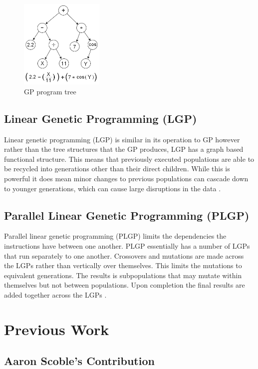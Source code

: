 \begin{figure}[h]
\centering
\includegraphics[width=40mm]{Genetic_Program_Tree.png}
\caption{GP program tree}
\centering
\end{figure}



\subsection{Linear Genetic Programming (LGP)}
Linear genetic programming (LGP) is similar in its operation to GP however rather than the tree structures that the GP produces, LGP has a graph based functional structure. This means that previously executed populations are able to be recycled into generations other than their direct children. While this is powerful it does mean minor changes to previous populations can cascade down to younger generations, which can cause large disruptions in the data \cite{poli1} \cite{16} \cite{17}. 


\subsection{Parallel Linear Genetic Programming (PLGP)}
Parallel linear genetic programming (PLGP) limits the dependencies the instructions have between one another. PLGP essentially has a number of LGPs that run separately to one another. Crossovers and mutations are made across the LGPs rather than vertically over themselves. This limits the mutations to equivalent generations. The results is subpopulations that may mutate within themselves but not between populations. Upon completion the final results are added together across the LGPs \cite{15} \cite{22} \cite{23} \cite{24}.


\section{Previous Work}
\subsection{Aaron Scoble's Contribution}

